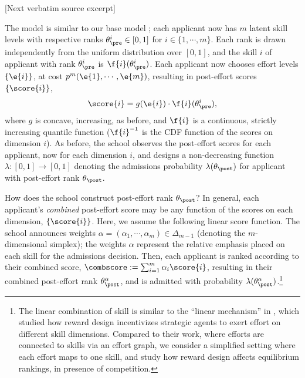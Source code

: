 \documentclass[10pt]{article}
\begin{document}
\begin{ReviewVerbatim}
{[Next verbatim source excerpt]

 The model is similar to our base model ; each applicant now has $m$ latent skill levels with respective ranks $\theta_\pre^i \in [0,1]$ for $i\in \{1, \cdots, m\}$. Each rank is drawn independently from the uniform distribution over $[0,1]$, and the skill $i$ of applicant with rank $\theta_\pre^i$ is $\f{i}(\theta_\pre^i)$. Each applicant now chooses effort levels $\{ \e{i} \}$, at cost $p^m( \e{1}, \cdots, \e{m})$, resulting in post-effort scores $\{\score{i}\}$,
\begin{equation*}
\score{i} = g(\e{i})\cdot \f{i}(\theta_\pre^i),
\end{equation*}
where $g$ is concave, increasing, as before, and $\f{i}$ is a continuous, strictly increasing quantile function (${\f{i}}^{-1}$ is the CDF function of the scores on dimension $i$). As before, the school observes the post-effort scores for each applicant, now for each dimension $i$, and designs a non-decreasing function $\lambda : [0,1] \to [0,1]$ denoting the admissions probability $\lambda(\theta_\post)$ for applicant with post-effort rank $\theta_\post$.


How does the school construct post-effort rank $\theta_\post$? In general, each applicant's \textit{combined} post-effort score may be any function of the scores on each dimension, $\{\score{i}\}$. Here, we assume the following linear score function. The school announces weights $\alpha = (\alpha_1, \cdots, \alpha_m) \in \Delta_{m-1}$ (denoting the $m$-dimensional simplex); the weights $\alpha$ represent the relative emphasis placed on each skill for the admissions decision. Then, each applicant is ranked according to their combined score, $\combscore := \sum_{i=1}^m \alpha_i\score{i}$, resulting in their combined post-effort rank $\theta_\post^\alpha$, and is admitted with probability $\lambda(\theta_\post^\alpha)$.\footnote{The linear combination of skill is similar to the ``linear mechanism'' in \citet{kleinberg18investeffort}, which studied how reward design incentivizes strategic agents to exert effort on different skill dimensions. Compared to their work, where efforts are connected to skills via an effort graph, we consider a simplified setting where each effort maps to one skill, and study how reward design affects equilibrium rankings, in presence of competition.}


}
\end{ReviewVerbatim}
\end{document}
